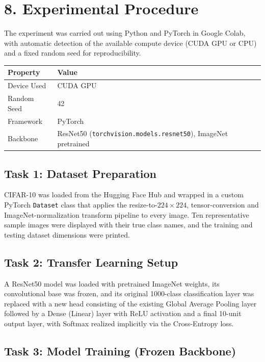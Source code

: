\documentclass[11pt,a4paper]{article}
\begin{document}
\section*{8. Experimental Procedure}

The experiment was carried out using Python and PyTorch in Google Colab, with automatic detection of the available compute device (CUDA GPU or CPU) and a fixed random seed for reproducibility.

\begin{center}
\begin{tabular}{|p{5cm}|p{7cm}|}
\hline
\textbf{Property} & \textbf{Value}\\
\hline
Device Used & CUDA GPU\\
\hline
Random Seed & 42\\
\hline
Framework & PyTorch\\
\hline
Backbone & ResNet50 (\texttt{torchvision.models.resnet50}), ImageNet pretrained\\
\hline
\end{tabular}
\end{center}

\vspace{0.3cm}

\subsection*{Task 1: Dataset Preparation}

CIFAR-10 was loaded from the Hugging Face Hub and wrapped in a custom PyTorch \texttt{Dataset} class that applies the resize-to-$224\times224$, tensor-conversion and ImageNet-normalization transform pipeline to every image. Ten representative sample images were displayed with their true class names, and the training and testing dataset dimensions were printed.

\subsection*{Task 2: Transfer Learning Setup}

A ResNet50 model was loaded with pretrained ImageNet weights, its convolutional base was frozen, and its original 1000-class classification layer was replaced with a new head consisting of the existing Global Average Pooling layer followed by a Dense (Linear) layer with ReLU activation and a final 10-unit output layer, with Softmax realized implicitly via the Cross-Entropy loss.

\subsection*{Task 3: Model Training (Frozen Backbone)}
\end{document}
